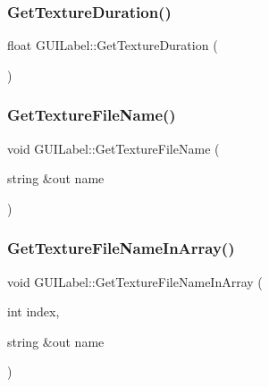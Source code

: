 \subsubsection{\texorpdfstring{Get\+Texture\+Duration()}{GetTextureDuration()}}
{\footnotesize\ttfamily float G\+U\+I\+Label\+::\+Get\+Texture\+Duration (\begin{DoxyParamCaption}{ }\end{DoxyParamCaption})}

\hypertarget{class_g_u_i_label_a72ab3d28c1313a3d66b8609a547d0f38}{}\label{class_g_u_i_label_a72ab3d28c1313a3d66b8609a547d0f38} 
\subsubsection{\texorpdfstring{Get\+Texture\+File\+Name()}{GetTextureFileName()}}
{\footnotesize\ttfamily void G\+U\+I\+Label\+::\+Get\+Texture\+File\+Name (\begin{DoxyParamCaption}\item[{string \&out}]{name }\end{DoxyParamCaption})}

\hypertarget{class_g_u_i_label_acd66d930468e451a4bb8ba1363cac68e}{}\label{class_g_u_i_label_acd66d930468e451a4bb8ba1363cac68e} 
\subsubsection{\texorpdfstring{Get\+Texture\+File\+Name\+In\+Array()}{GetTextureFileNameInArray()}}
{\footnotesize\ttfamily void G\+U\+I\+Label\+::\+Get\+Texture\+File\+Name\+In\+Array (\begin{DoxyParamCaption}\item[{int}]{index,  }\item[{string \&out}]{name }\end{DoxyParamCaption})}

\hypertarget{class_g_u_i_label_a7dd7f76126c6234d91a41e48a6b16f6d}{}\label{class_g_u_i_label_a7dd7f76126c6234d91a41e48a6b16f6d} 
